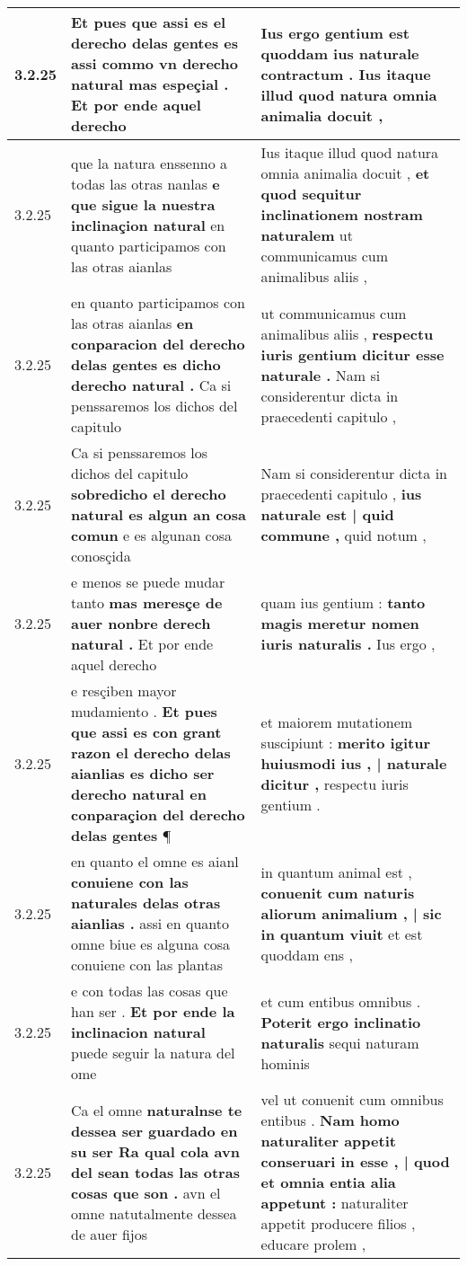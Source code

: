 \begin{tabular}{|p{1cm}|p{6.5cm}|p{6.5cm}|}
3.2.25 & Et pues que assi es el derecho delas gentes es \textbf{ assi commo vn derecho natural mas espeçial . } Et por ende aquel derecho & Ius ergo gentium est \textbf{ quoddam ius naturale contractum . } Ius itaque illud quod natura omnia animalia docuit , \\\hline
3.2.25 & que la natura enssenno a todas las otras nanlas \textbf{ e que sigue la nuestra inclinaçion natural } en quanto participamos con las otras aianlas & Ius itaque illud quod natura omnia animalia docuit , \textbf{ et quod sequitur inclinationem nostram naturalem } ut communicamus cum animalibus aliis , \\\hline
3.2.25 & en quanto participamos con las otras aianlas \textbf{ en conparacion del derecho delas gentes es dicho derecho natural . } Ca si penssaremos los dichos del capitulo & ut communicamus cum animalibus aliis , \textbf{ respectu iuris gentium dicitur esse naturale . } Nam si considerentur dicta in praecedenti capitulo , \\\hline
3.2.25 & Ca si penssaremos los dichos del capitulo \textbf{ sobredicho el derecho natural es algun an cosa comun } e es algunan cosa conosçida & Nam si considerentur dicta in praecedenti capitulo , \textbf{ ius naturale est | quid commune , } quid notum , \\\hline
3.2.25 & e menos se puede mudar tanto \textbf{ mas meresçe de auer nonbre derech natural . } Et por ende aquel derecho & quam ius gentium : \textbf{ tanto magis meretur nomen iuris naturalis . } Ius ergo , \\\hline
3.2.25 & e resçiben mayor mudamiento . \textbf{ Et pues que assi es con grant razon el derecho delas aianlias es dicho ser derecho natural en conparaçion del derecho delas gentes } ¶ & et maiorem mutationem suscipiunt : \textbf{ merito igitur huiusmodi ius , | naturale dicitur , } respectu iuris gentium . \\\hline
3.2.25 & en quanto el omne es aianl \textbf{ conuiene con las naturales delas otras aianlias . } assi en quanto omne biue es alguna cosa conuiene con las plantas & in quantum animal est , \textbf{ conuenit cum naturis aliorum animalium , | sic in quantum viuit } et est quoddam ens , \\\hline
3.2.25 & e con todas las cosas que han ser . \textbf{ Et por ende la inclinacion natural } puede seguir la natura del ome & et cum entibus omnibus . \textbf{ Poterit ergo inclinatio naturalis } sequi naturam hominis \\\hline
3.2.25 & Ca el omne \textbf{ naturalnse te dessea ser guardado en su ser Ra qual cola avn del sean todas las otras cosas que son . } avn el omne natutalmente dessea de auer fijos & vel ut conuenit cum omnibus entibus . \textbf{ Nam homo naturaliter appetit conseruari in esse , | quod et omnia entia alia appetunt : } naturaliter appetit producere filios , educare prolem , \\\hline

\end{tabular}
